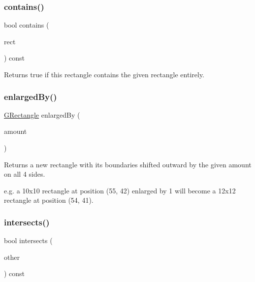 \mbox{\label{structsgl_1_1GRectangle_a5e2ef5fc6df7e73cd949c042ba2ffcf7}} 
\subsubsection{\texorpdfstring{contains()}{contains()}\hspace{0.1cm}{\footnotesize\ttfamily [3/3]}}
{\footnotesize\ttfamily bool contains (\begin{DoxyParamCaption}\item[{const \mbox{\hyperlink{structsgl_1_1GRectangle}{G\+Rectangle}} \&}]{rect }\end{DoxyParamCaption}) const}



Returns {\ttfamily true} if this rectangle contains the given rectangle entirely. 

\mbox{\label{structsgl_1_1GRectangle_adddb08ead701a5144949ca673a44292c}} 
\subsubsection{\texorpdfstring{enlarged\+By()}{enlargedBy()}}
{\footnotesize\ttfamily \mbox{\hyperlink{structsgl_1_1GRectangle}{G\+Rectangle}} enlarged\+By (\begin{DoxyParamCaption}\item[{double}]{amount }\end{DoxyParamCaption})}



Returns a new rectangle with its boundaries shifted outward by the given amount on all 4 sides. 

e.\+g. a 10x10 rectangle at position (55, 42) enlarged by 1 will become a 12x12 rectangle at position (54, 41). \mbox{\label{structsgl_1_1GRectangle_aea079d10c5a74c6e7c83b44a44357b42}} 
\subsubsection{\texorpdfstring{intersects()}{intersects()}}
{\footnotesize\ttfamily bool intersects (\begin{DoxyParamCaption}\item[{const \mbox{\hyperlink{structsgl_1_1GRectangle}{G\+Rectangle}} \&}]{other }\end{DoxyParamCaption}) const}



